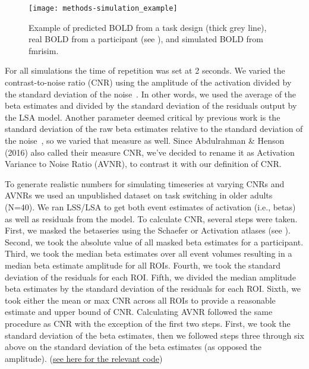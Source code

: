 \documentclass[10pt,letterpaper]{article}
\begin{document}
\begin{figure}[H]
  \centering
  \texttt{[image: methods-simulation\_example]}
  \caption{
    Example of predicted BOLD from a task design (thick grey line), real BOLD
    from a participant (see ), and simulated BOLD
    from fmrisim\cite{Ellis2020}.
  }
  \label{fig:simulation_example}
\end{figure}

For all simulations the time of repetition was set at 2 seconds.
We varied the contrast-to-noise ratio (CNR) using the amplitude of the activation
divided by the standard deviation of the noise~\cite{Welvaert2013a}.
In other words, we used the average of the beta estimates and divided by the standard
deviation of the residuals output by the LSA model.
Another parameter deemed critical by previous work is the standard deviation
of the raw beta estimates relative to the standard deviation of the noise~\cite{Abdulrahman2016},
so we varied that measure as well.
Since Abdulrahman \& Henson (2016)\cite{Abdulrahman2016} also called their measure
CNR, we've decided to rename it as Activation Variance to Noise Ratio (AVNR), to
contrast it with our definition of CNR.

To generate realistic numbers for simulating timeseries at varying CNRs and AVNRs
we used an unpublished dataset on task switching in older adults (N=40).
We ran LSS/LSA to get both event estimates of activation (i.e., betas)
as well as residuals from the model.
To calculate CNR, several steps were taken.
First, we masked the betaseries using the Schaefer or Activation atlases (see ).
Second, we took the absolute value of all masked beta estimates for a participant.
Third, we took the median beta estimates over all event volumes resulting
in a median beta estimate amplitude for all ROIs.
Fourth, we took the standard deviation of the residuals for each ROI.
Fifth, we divided the median amplitude beta estimates by the standard deviation of the residuals
for each ROI.
Sixth, we took either the mean or max CNR across all ROIs to provide a reasonable estimate
and upper bound of CNR.
Calculating AVNR followed the same procedure as CNR with the exception of the first two steps.
First, we took the standard deviation of the beta estimates, then we followed steps three through six above
on the standard deviation of the beta estimates (as opposed the amplitude).
(\href{https://github.com/jdkent/BetaSeriesRealDataAnalysis/blob/90fafb5b83b2e1bfade61a9fb1a87f225efaa95f/nibsAnalysis/cnr_trial_variability.ipynb}{see here for the relevant code})
\end{document}
